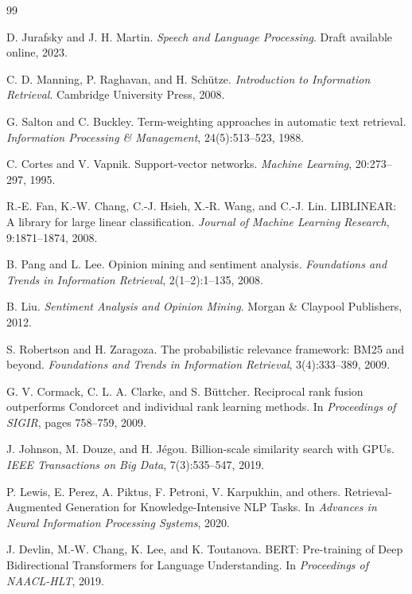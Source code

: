 \begin{thebibliography}{99}

D. Jurafsky and J. H. Martin.
\textit{Speech and Language Processing}.
Draft available online, 2023.

C. D. Manning, P. Raghavan, and H. Schütze.
\textit{Introduction to Information Retrieval}.
Cambridge University Press, 2008.

G. Salton and C. Buckley.
Term-weighting approaches in automatic text retrieval.
\textit{Information Processing \& Management}, 24(5):513--523, 1988.

C. Cortes and V. Vapnik.
Support-vector networks.
\textit{Machine Learning}, 20:273--297, 1995.

R.-E. Fan, K.-W. Chang, C.-J. Hsieh, X.-R. Wang, and C.-J. Lin.
LIBLINEAR: A library for large linear classification.
\textit{Journal of Machine Learning Research}, 9:1871--1874, 2008.

B. Pang and L. Lee.
Opinion mining and sentiment analysis.
\textit{Foundations and Trends in Information Retrieval}, 2(1--2):1--135, 2008.

B. Liu.
\textit{Sentiment Analysis and Opinion Mining}.
Morgan \& Claypool Publishers, 2012.

S. Robertson and H. Zaragoza.
The probabilistic relevance framework: BM25 and beyond.
\textit{Foundations and Trends in Information Retrieval}, 3(4):333--389, 2009.

G. V. Cormack, C. L. A. Clarke, and S. Büttcher.
Reciprocal rank fusion outperforms Condorcet and individual rank learning methods.
In \textit{Proceedings of SIGIR}, pages 758--759, 2009.

J. Johnson, M. Douze, and H. Jégou.
Billion-scale similarity search with GPUs.
\textit{IEEE Transactions on Big Data}, 7(3):535--547, 2019.

P. Lewis, E. Perez, A. Piktus, F. Petroni, V. Karpukhin, and others.
Retrieval-Augmented Generation for Knowledge-Intensive NLP Tasks.
In \textit{Advances in Neural Information Processing Systems}, 2020.

J. Devlin, M.-W. Chang, K. Lee, and K. Toutanova.
BERT: Pre-training of Deep Bidirectional Transformers for Language Understanding.
In \textit{Proceedings of NAACL-HLT}, 2019.


\end{thebibliography}
